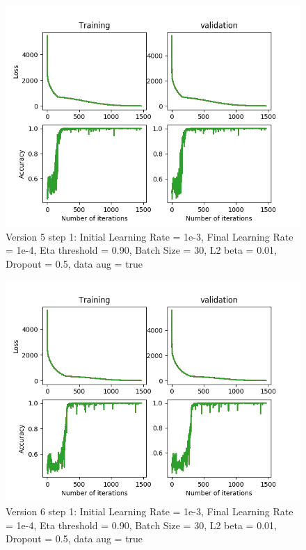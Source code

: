 \documentclass[12pt,reqno]{amsart}
\numberwithin{equation}{section}
\begin{document}
\begin{enumerate}
\begin{figure}[H]
\centering
\includegraphics[scale=0.6]{data_liquid15_version5_step1}
\caption{Version 5 step 1: Initial Learning Rate = 1e-3, Final Learning Rate = 1e-4, Eta threshold = 0.90, Batch Size = 30, L2 beta = 0.01, Dropout = 0.5, data aug = true}
\end{figure}

\begin{figure}[H]
\centering
\includegraphics[scale=0.6]{data_liquid15_version6_step1}
\caption{Version 6 step 1: Initial Learning Rate = 1e-3, Final Learning Rate = 1e-4, Eta threshold = 0.90, Batch Size = 30, L2 beta = 0.01, Dropout = 0.5, data aug = true}
\end{figure}


\end{enumerate}
\end{document}
